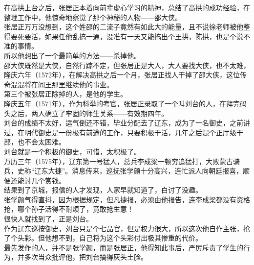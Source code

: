 \begin{multicols}{\theparacolNo}
在高拱上台之后，张居正本着向前辈虚心学习的精神，总结了高拱的成功经验，在整理工作中，他惊奇地察觉了那个神秘的人物——邵大侠。\\

张居正万万没想到，这个姓邵的二流子竟然有如此大的能量，且不说徐老师被他整得要死要活，如果任他乱搞一通，没准有一天又能搞出个王拱，陈拱，也是个说不准的事情。\\

所以他想出了一个最简单的方法——杀掉他。\\

邵大侠既然是大侠，自然行踪不定，但张居正是大人，大人要找大侠，也不太难，隆庆六年（1572年），在解决高拱之后一个月，张居正找人干掉了邵大侠，这位传奇混混将在阎王那里继续他的事业。\\

第三个被张居正除掉的人，是他的学生。\\

隆庆五年（1571年），作为科举的考官，张居正录取了一个叫刘台的人，在拜完码头之后，两人确立了牢固的师生关系——有效期四年。\\

刘台的成绩不太好，运气倒还不错，毕业分配去了辽东，成为了一名御史，之前讲过，在明代御史是一份极有前途的工作，只要积极干活，几年之后混个正厅级干部，也不会太困难。\\

刘台就是一个积极的御史，可惜，太积极了。\\

万历三年（1575年），辽东第一号猛人，总兵李成梁一顿穷追猛打，大败蒙古骑兵，史称“辽东大捷”。消息传来，巡抚张学颜十分高兴，连忙派人向朝廷报喜，顺便还能讨几个赏钱。\\

结果到了京城，报信的人才发现，人家早就知道了，白讨了没趣。\\

张学颜气得直抖，因为根据规定，但凡捷报，必须由他报告，连李成梁都没有资格抢，哪个孙子活得不耐烦了，竟敢抢生意！\\

很快人就找到了，正是刘台。\\

作为辽东巡按御史，刘台只是个七品官，但是权力很大，所以这次他自作主张，抢了个头彩。但他想不到，自己将为这个头彩付出极其惨重的代价。\\

最先发作的人，并不是张学颜，而是张居正，他得知此事后，严厉斥责了学生的行为，并多次当众批评他，把刘台搞得灰头土脸。\\


\end{multicols}
